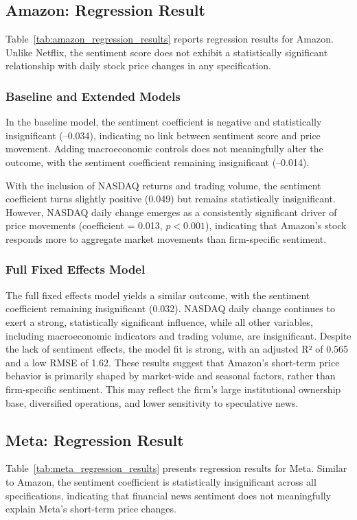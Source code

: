 \documentclass[12pt]{article}
\begin{document}
\subsection{Amazon: Regression Result
}
Table~\ref{tab:amazon_regression_results} reports regression results for Amazon. Unlike Netflix, the sentiment score does not exhibit a statistically significant relationship with daily stock price changes in any specification.

\subsubsection{Baseline and Extended Models
}
In the baseline model, the sentiment coefficient is negative and statistically insignificant (–0.034), indicating no link between sentiment score and price movement. Adding macroeconomic controls does not meaningfully alter the outcome, with the sentiment coefficient remaining insignificant (–0.014). 

With the inclusion of NASDAQ returns and trading volume, the sentiment coefficient turns slightly positive (0.049) but remains statistically insignificant. However, NASDAQ daily change emerges as a consistently significant driver of price movements (coefficient = 0.013, $p < 0.001$), indicating that Amazon's stock responds more to aggregate market movements than firm-specific sentiment.

\subsubsection{Full Fixed Effects Model
}
The full fixed effects model yields a similar outcome, with the sentiment coefficient remaining insignificant (0.032). NASDAQ daily change continues to exert a strong, statistically significant influence, while all other variables, including macroeconomic indicators and trading volume, are insignificant.
Despite the lack of sentiment effects, the model fit is strong, with an adjusted R² of 0.565 and a low RMSE of 1.62. These results suggest that Amazon’s short-term price behavior is primarily shaped by market-wide and seasonal factors, rather than firm-specific sentiment. This may reflect the firm’s large institutional ownership base, diversified operations, and lower sensitivity to speculative news.


\subsection{Meta: Regression Result
}
Table~\ref{tab:meta_regression_results} presents regression results for Meta. Similar to Amazon, the sentiment coefficient is statistically insignificant across all specifications, indicating that financial news sentiment does not meaningfully explain Meta’s short-term price changes.
\end{document}
